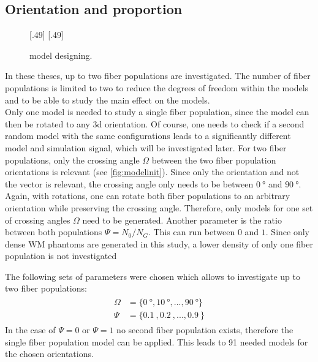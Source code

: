 \subsection{Orientation and proportion}
% 
\begin{figure}[t]
\centering
\def\tikzwidth{0.42*\textwidth}
[.49\textwidth]{\hfill{}\hfill}\hfill
{}
[.49\textwidth]{\hfill{}\hfill}
\\
\caption{model designing.}
\label{fig:twomodelpopdesign}
\end{figure}
% 
In these theses, up to two fiber populations are investigated.
The number of fiber populations is limited to two to reduce the degrees of freedom within the models and to be able to study the main effect on the models.
\\
% 
Only one model is needed to study a single fiber population, since the model can then be rotated to any 3d orientation.
Of course, one needs to check if a second random model with the same configurations leads to a significantly different model and simulation signal, which will be investigated later.
For two fiber populations, only the crossing angle $\Omega$ between the two fiber population orientations is relevant (see \cref{fig:modelinit}).
Since only the orientation and not the vector is relevant, the crossing angle only needs to be between $\SI{0}{\degree}$ and $\SI{90}{\degree}$.
Again, with rotations, one can rotate both fiber populations to an arbitrary orientation while preserving the crossing angle.
Therefore, only models for one set of crossing angles $\Omega$ need to be generated.
Another parameter is the ratio between both populations $\Psi=N_0/N_G$.
This can run between $0$ and $1$.
Since only dense \ac{WM} phantoms are generated in this study, a lower density of only one fiber population is not investigated
\par
% 
The following sets of parameters were chosen which allows to investigate up to two fiber populations:
\begin{align}
    \begin{split}
        \Omega &= \{\SI{0}{\degree}, \SI{10}{\degree}, ..., \SI{90}{\degree}\}\\
        \Psi &= \{\SI{0.1}{}, \SI{0.2}{}, ..., \SI{0.9}{}\}
    \end{split}
\end{align}
In the case of $\Psi = 0$ or $\Psi = 1$ no second fiber population exists, therefore the single fiber population model can be applied.
This leads to 91 needed models for the chosen orientations.
% 
